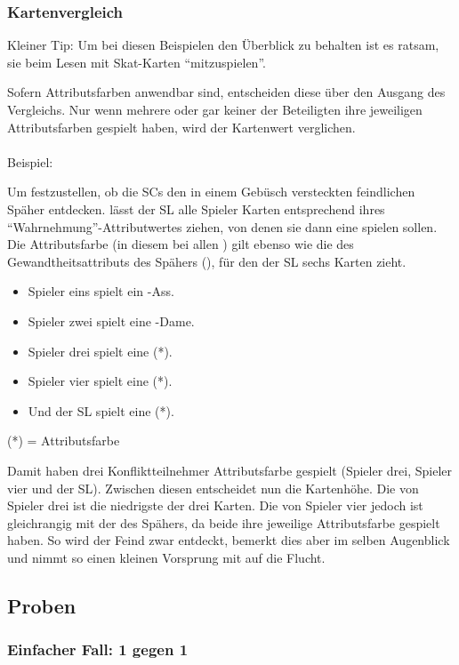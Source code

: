 \subsubsection {Kartenvergleich}

Kleiner Tip: Um bei diesen Beispielen den Überblick zu behalten ist es ratsam, sie beim Lesen mit Skat-Karten "`mitzuspielen"'.

Sofern Attributsfarben anwendbar sind, entscheiden diese über den Ausgang des Vergleichs. Nur wenn mehrere oder gar keiner der Beteiligten ihre jeweiligen Attributsfarben gespielt haben, wird der Kartenwert verglichen.
\\
\\
Beispiel:

Um festzustellen, ob die SCs den in einem Gebüsch versteckten feindlichen Späher entdecken. lässt der SL alle Spieler Karten entsprechend ihres "`Wahrnehmung"'-Attributwertes ziehen, von denen sie dann eine spielen sollen. Die Attributsfarbe (in diesem bei allen \karo) gilt ebenso wie die des Gewandtheitsattributs des Spähers (\pik), für den der SL sechs Karten zieht.
\begin {itemize}
\item Spieler eins spielt ein \kreuz-Ass.
\item Spieler zwei spielt eine \herz-Dame.
\item Spieler drei spielt eine  (*).
\item Spieler vier spielt eine  (*).
\item Und der SL spielt eine  (*).
\end {itemize}
(*) = Attributsfarbe

Damit haben drei Konfliktteilnehmer Attributsfarbe gespielt (Spieler drei, Spieler vier und der SL). Zwischen diesen entscheidet nun die Kartenhöhe. Die  von Spieler drei ist die niedrigste der drei Karten. Die  von Spieler vier jedoch ist gleichrangig mit der  des Spähers, da beide ihre jeweilige Attributsfarbe gespielt haben. So wird der Feind zwar entdeckt, bemerkt dies aber im selben Augenblick und nimmt so einen kleinen Vorsprung mit auf die Flucht.


\subsection {Proben}
\subsubsection {Einfacher Fall: 1 gegen 1}

